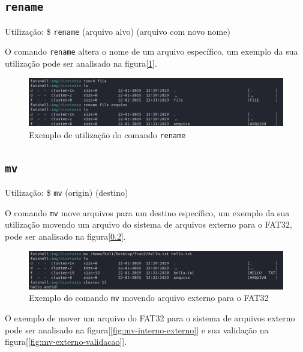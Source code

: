 \documentclass[
    12pt,				%
    oneside,   	        %
    a4paper,			%
    english,			%
    french,				%
    spanish,			%
    brazil,				%
    ]{pacotes/abntex2}
\begin{document}

\subsection{\texttt{rename}}
\label{subsec:rename}
Utilização: \$ \texttt{rename} (arquivo alvo) (arquivo com novo nome)

O comando \texttt{rename} altera o nome de um arquivo específico, um exemplo da sua utilização pode ser analisado na figura[\ref{fig:rename}].

\begin{figure}[H]
    \centering
    \includegraphics[width=450pt]{figuras/resultados/11-rename.PNG}
    \caption{Exemplo de utilização do comando \texttt{rename}}
    \label{fig:rename}
\end{figure}


\subsection{\texttt{mv}}
\label{subsec:mv}
Utilização: \$ \texttt{mv} (origin) (destino)

O comando \texttt{mv} move arquivos para um destino específico, um exemplo da sua utilização movendo um arquivo do sistema de arquivos externo para o FAT32, pode ser analisado na figura[\ref{subsec:mv}].

\begin{figure}[H]
    \centering
    \includegraphics[width=450pt]{figuras/resultados/12-mv-externo-iterno.PNG}
    \caption{Exemplo do comando \texttt{mv} movendo arquivo externo para o FAT32}
    \label{fig:mv-externo-interno}
\end{figure}

O exemplo de mover um arquivo do FAT32 para o sistema de arquivos externo pode ser analisado na figura[\ref{fig:mv-interno-externo}] e sua validação na figura[\ref{fig:mv-externo-validacao}].
\end{document}

